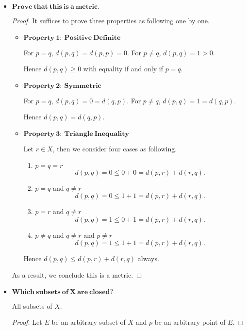 \begin{Exercise}
\begin{itemize}
\item $\mathbf{Prove\ that\ this\ is\ a\ metric.}$
\begin{proof}
It suffices to prove three properties as following one by one.
\begin{itemize}
\item $\mathbf{Property\ 1:\ Positive\ Definite}$

For $p=q$, $d(p,q) = d(p,p) = 0$. For $p\neq q$, $d(p,q) = 1 > 0$.

Hence $d(p,q)\geq 0$ with equality if and only if $p=q$.

\item $\mathbf{Property\ 2:\ Symmetric}$

For $p=q$, $d(p,q) = 0 = d(q,p)$. For $p\neq q$, $d(p,q) = 1 = d(q,p)$.

Hence $d(p,q) = d(q,p)$.

\item $\mathbf{Property\ 3:\ Triangle\ Inequality}$

Let $r\in X$, then we consider four cases as following.

\begin{enumerate}
\item $p=q=r$
$$
d(p,q) = 0 \leq 0 + 0 = d(p,r) + d(r,q).
$$

\item $p=q$ and $q\neq r$
$$
d(p,q) = 0 \leq 1 + 1 = d(p,r) + d(r,q).
$$

\item $p=r$ and $q\neq r$
$$
d(p,q) = 1 \leq 0 + 1 = d(p,r) + d(r,q).
$$

\item $p\neq q$ and $q\neq r$ and $p \neq r$
$$
d(p,q) = 1 \leq 1 + 1 = d(p,r) + d(r,q).
$$
\end{enumerate}

Hence $d(p,q) \leq d(p,r) + d(r,q)$ always.
\end{itemize}

As a result, we conclude this is a metric.
\end{proof}

\item $\mathbf{Which\ subsets\ of\ X\ are\ closed?}$
\begin{answer}
All subsets of $X$.
\end{answer}
\begin{proof}
Let $E$ be an arbitrary subset of $X$ and $p$ be an arbitrary point of $E$. 


\end{proof}
\end{itemize}
\end{Exercise}
